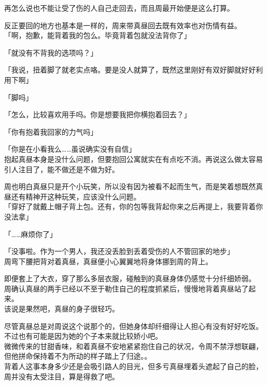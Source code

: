 再怎么说也不能让受了伤的人自己走回去，而且周最开始便是这么打算。

反正要回的地方也基本是一样的，周来带真昼回去既有效率也对伤情有益。\\

「啊，抱歉，能背着我的包么。毕竟背着包就没法背你了」

「就没有不背我的选项吗？」

「我说，扭着脚了就老实点咯。要是没人就算了，既然这里刚好有双好脚就好好利用下啊」

「脚吗」

「怎么，比较喜欢用手吗。你是想要我把你横抱着回去？」

「你有抱着我回家的力气吗」

「你是在小看我么……虽说确实没有自信」\\

抱起真昼本身是没什么问题，但要抱回公寓就实在有点吃不消。再说这么做太容易引人注目了，能不做还是不做为好。

周也明白真昼只是开个小玩笑，所以没有因为被看不起而生气，而是笑着想既然真昼还有精神开这种玩笑，应该没什么问题。\\

「穿好了就戴上帽子背上包。还有，你的包等我背起你来之后再提上，我要背着你没法拿」

「……麻烦你了」

「没事啦。作为一个男人，我还没丢脸到丢着受伤的人不管回家的地步」\\

周弯下腰把背对着真昼，真昼便小心翼翼地将身体挪到周的背上。

即便套上了大衣，穿了那么多层衣服，碰触到的真昼身体仍感觉十分纤细娇弱。\\

周确认真昼的两手已经以不至于勒住自己的程度抓紧后，慢慢地背着真昼站了起来。\\

该说是果然吧，真昼的身子很轻巧。

尽管真昼总是对周说这个说那个的，但她身体却纤细得让人担心有没有好好吃饭。不过也有可能是因为她的个子本来就比较娇小吧。\\

微微传来的甘甜香味，和着真昼不安地紧紧抱住自己的状况，令周不禁浮想联翩，但他拼命保持着不为所动的样子踏上了归途。。\\

背着人这事本身多少还是会吸引路人的目光，但多亏真昼埋着头遮起了自己的脸，周并没有太受注目，算是得救了吧。\\

